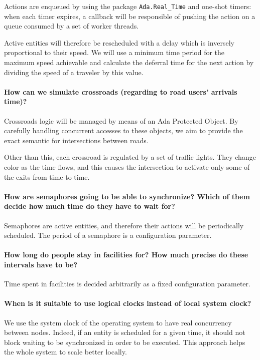 Actions are enqueued by using the package \texttt{Ada.Real\_Time} and one-shot
timers: when each timer expires, a callback will be responsible of pushing the
action on a queue consumed by a set of worker threads.

Active entities will therefore be rescheduled with a delay which is inversely
proportional to their speed. We will use a minimum time period for the maximum
speed achievable and calculate the deferral time for the next action by
dividing the speed of a traveler by this value.

\paragraph{How can we simulate crossroads (regarding to road users' arrivals
  time)?}
Crossroads logic will be managed by means of an Ada Protected Object. By
carefully handling concurrent accesses to these objects, we aim to provide the
exact semantic for intersections between roads.

Other than this, each crossroad is regulated by a set of traffic lights. They
change color as the time flows, and this causes the intersection to activate
only some of the exits from time to time.


\paragraph{How are semaphores going to be able to synchronize? Which of them
  decide how much time do they have to wait for?}
Semaphores are active entities, and therefore their actions will be
periodically scheduled.
The period of a semaphore is a configuration parameter.

\paragraph{How long do people stay in facilities for? How much precise do these
  intervals have to be?}
Time spent in facilities is decided arbitrarily as a fixed configuration
parameter.


\paragraph{When is it suitable to use logical clocks instead of local system
  clock?}
We use the system clock of the operating system to
have real concurrency between nodes. Indeed, if an entity is scheduled for a
given time, it should not block waiting to be synchronized
in order to be executed. This approach helps the whole system to scale better
locally.
